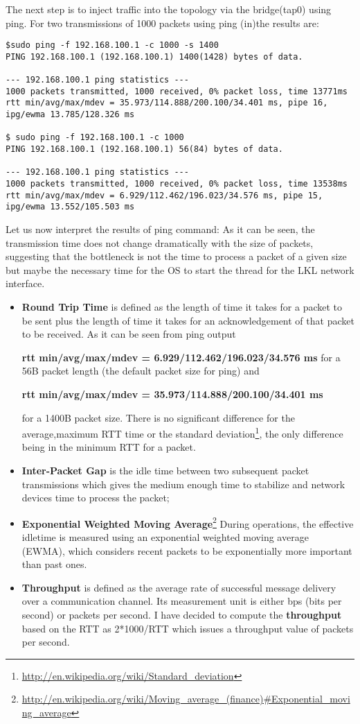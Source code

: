 The next step is to inject traffic into the topology via the bridge(tap0) using ping.
For two transmissions of 1000 packets using ping (in)the results are:
\begin{lstlisting}
$sudo ping -f 192.168.100.1 -c 1000 -s 1400
PING 192.168.100.1 (192.168.100.1) 1400(1428) bytes of data.
                
--- 192.168.100.1 ping statistics ---
1000 packets transmitted, 1000 received, 0% packet loss, time 13771ms
rtt min/avg/max/mdev = 35.973/114.888/200.100/34.401 ms, pipe 16, ipg/ewma 13.785/128.326 ms

$ sudo ping -f 192.168.100.1 -c 1000 
PING 192.168.100.1 (192.168.100.1) 56(84) bytes of data.
               
--- 192.168.100.1 ping statistics ---
1000 packets transmitted, 1000 received, 0% packet loss, time 13538ms
rtt min/avg/max/mdev = 6.929/112.462/196.023/34.576 ms, pipe 15, ipg/ewma 13.552/105.503 ms
\end{lstlisting}
Let us now interpret the results of ping command:
As it can be seen, the transmission time does not change dramatically with the size of packets, suggesting that the bottleneck is not the time to process a packet of a given size but maybe the necessary time for the OS to start the thread for the LKL network interface.
\begin{itemize}
\item \textbf{Round Trip Time} is defined as the length of time it takes for a packet to be sent plus the length of time it takes for an acknowledgement of that packet to be received.
As it can be seen from ping output 

\textbf{rtt min/avg/max/mdev = 6.929/112.462/196.023/34.576 ms}
for a 56B packet length (the default packet size for ping) and 

\textbf{rtt min/avg/max/mdev = 35.973/114.888/200.100/34.401 ms}

for a 1400B packet size. There is no significant difference for the average,maximum RTT time or the standard deviation\footnote{\url{http://en.wikipedia.org/wiki/Standard_deviation}}, the only difference being in the minimum RTT for a packet.  
\item \textbf{Inter-Packet Gap} is the idle time between two subsequent packet transmissions which gives the medium enough time to stabilize and network devices time to process the packet;

\item \textbf{Exponential Weighted Moving Average}\footnote{\url{http://en.wikipedia.org/wiki/Moving_average_(finance)#Exponential_moving_average}} During operations, the effective idletime is measured using an exponential weighted moving average (EWMA), which considers recent packets to be exponentially more important than past ones. 

\item \textbf{Throughput} is defined as the average rate of successful message delivery over a communication channel. Its measurement unit is either bps (bits per second) or packets per second.
I have decided to compute the \textbf{throughput} based on the RTT as 2*1000/RTT which issues a throughput value of  packets per second. 
\end{itemize}
